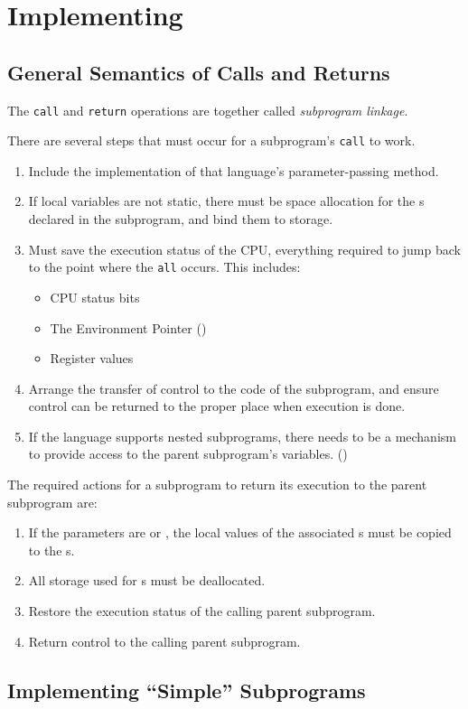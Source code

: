 \section{Implementing }\label{sec:Implementing_Subprograms}
\subsection{General Semantics of Calls and Returns}\label{subsec:Semantics_of_Calls_and_Returns}
\begin{definition}\label{def:Subprogram_Linkage}
  The \texttt{call} and \texttt{return} operations are together called \emph{subprogram linkage}.
\end{definition}

There are several steps that must occur for a subprogram's \texttt{call} to work.
\begin{enumerate}[noitemsep]
\item Include the implementation of that language's parameter-passing method.
\item If local variables are not static, there must be space allocation for the s declared in the subprogram, and bind them to storage.
\item Must save the execution status of the CPU, everything required to jump back to the point where the \texttt{all} occurs. This includes:
  \begin{itemize}[noitemsep]
  \item CPU status bits
  \item The Environment Pointer ()
  \item Register values
  \end{itemize}
\item Arrange the transfer of control to the code of the subprogram, and ensure control can be returned to the proper place when execution is done.
\item If the language supports nested subprograms, there needs to be a mechanism to provide access to the parent subprogram's variables. ()
\end{enumerate}

The required actions for a subprogram to return its execution to the parent subprogram are:
\begin{enumerate}[noitemsep]
\item If the parameters are  or , the local values of the associated s must be copied to the s.
\item All storage used for s must be deallocated.
\item Restore the execution status of the calling parent subprogram.
\item Return control to the calling parent subprogram.
\end{enumerate}

\subsection{Implementing ``Simple'' Subprograms}\label{subsec:Implementing_Simple_Subprograms}
